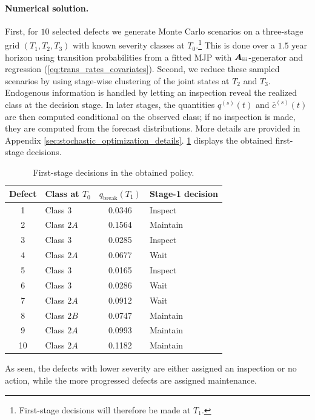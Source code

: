 \documentclass{article}
\newcommand{\RN}[1]{\textup{\uppercase\expandafter{\romannumeral#1}}}
\begin{document}
\paragraph{Numerical solution.}
First, for $10$ selected defects we generate Monte Carlo scenarios on a three-stage grid $(T_1,T_2,T_3)$ with known severity classes at $T_0$.\footnote{First-stage decisions will therefore be made at $T_1$.}
This is done over a $1.5$ year horizon using transition probabilities from a fitted MJP with $\bm{A}_{\RN{3}}$-generator and regression (\cref{eq:trans_rates_covariates}). 
Second, we reduce these sampled scenarios by using stage-wise clustering of the joint states at $T_2$ and $T_3$.
Endogenous information is handled by letting an inspection reveal the realized class at the decision stage. In later stages, the quantities $q^{(s)}(t)$ and $\bar c^{(s)}(t)$ are then computed conditional on the observed class; if no inspection is made, they are computed from the forecast distributions. More details are provided in Appendix \ref{sec:stochastic_optimization_details}.
\cref{tab:decisions} displays the obtained first-stage decisions.
\begin{table}[htb!]
\centering
\caption{First-stage decisions in the obtained policy.} \label{tab:decisions}
\begin{tabular}{clcl}
\toprule
Defect & Class at $T_0$ & \(q_{\mathrm{break}}(T_1)\) & Stage-1 decision \\
\midrule
1 & Class $3$ & 0.0346 & Inspect \\
2 & Class $2A$ & 0.1564 & Maintain \\
3 & Class $3$ & 0.0285 & Inspect \\
4 & Class $2A$ & 0.0677 & Wait \\
5 &Class $3$ & 0.0165 & Inspect \\
6 & Class $3$ & 0.0286 & Wait \\
7 & Class $2A$ & 0.0912 & Wait \\
8 & Class $2B$ & 0.0747 & Maintain \\
9 & Class $2A$ & 0.0993 & Maintain \\
10 & Class $2A$ & 0.1182 & Maintain \\
\bottomrule
\end{tabular}
\end{table}
As seen, the defects with lower severity are either assigned an inspection or no action, while the more progressed defects are assigned maintenance.
\end{document}
